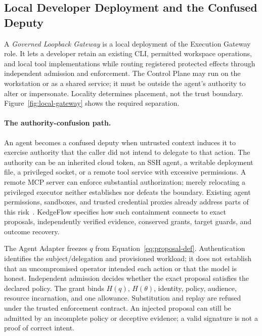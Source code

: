 \subsection{Local Developer Deployment and the Confused Deputy}
\label{sec:local-deployment}

A \emph{Governed Loopback Gateway} is a local deployment of the Execution Gateway role. It lets a developer retain an existing CLI, permitted workspace operations, and local tool implementations while routing registered protected effects through independent admission and enforcement. The Control Plane may run on the workstation or as a shared service; it must be outside the agent's authority to alter or impersonate. Locality determines placement, not the trust boundary. Figure~\ref{fig:local-gateway} shows the required separation.

\paragraph{The authority-confusion path.}
An agent becomes a confused deputy when untrusted context induces it to exercise authority that the caller did not intend to delegate to that action. The authority can be an inherited cloud token, an SSH agent, a writable deployment file, a privileged socket, or a remote tool service with excessive permissions. A remote MCP server can enforce substantial authorization; merely relocating a privileged executor neither establishes nor defeats the boundary. Existing agent permissions, sandboxes, and trusted credential proxies already address parts of this risk~\cite{claudecodepermissions2026,codexpermissions2026,openaisandboxsecurity2026}. KedgeFlow specifies how such containment connects to exact proposals, independently verified evidence, conserved grants, target guards, and outcome recovery.

The Agent Adapter freezes $q$ from Equation~\ref{eq:proposal-def}. Authentication identifies the subject/delegation and provisioned workload; it does not establish that an uncompromised operator intended each action or that the model is honest. Independent admission decides whether the exact proposal satisfies the declared policy. The grant binds $H(q)$, $H(\theta)$, identity, policy, audience, resource incarnation, and one allowance. Substitution and replay are refused under the trusted enforcement contract. An injected proposal can still be admitted by an incomplete policy or deceptive evidence; a valid signature is not a proof of correct intent.

